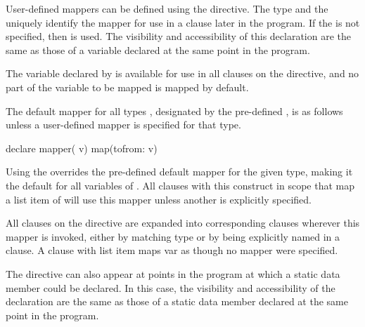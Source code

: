 \descr


User-defined mappers can be defined using the  directive.
The type and the  uniquely identify the mapper for use in
a  clause later in the program.  If the  is not
specified, then  is used.  The visibility and accessibility of
this declaration are the same as those of a variable declared at the same point
in the program.

The variable declared by  is available for use in all 
clauses on the directive, and no part of the variable to be mapped is mapped by
default.

The default mapper for all types , designated by the pre-defined
 , is as follows unless a user-defined mapper is
specified for that type.

\begin{ompSyntax}

declare mapper( v) map(tofrom: v)

\end{ompSyntax}

Using the   overrides the pre-defined
default mapper for the given type, making it the default for all
variables of . All  clauses with this construct in scope
that map a list item of  will use this mapper unless another is
explicitly specified.

All  clauses on the directive are expanded into corresponding
 clauses wherever this mapper is invoked, either by matching type or
by being explicitly named in a  clause. A  clause with list item
 maps var as though no mapper were specified.


\begin{cppspecific}
The  directive can also appear at points in the program at
which a static data member could be declared. In this case, the visibility and
accessibility of the declaration are the same as those of a static data member
declared at the same point in the program.

\end{cppspecific}

\restrictions

